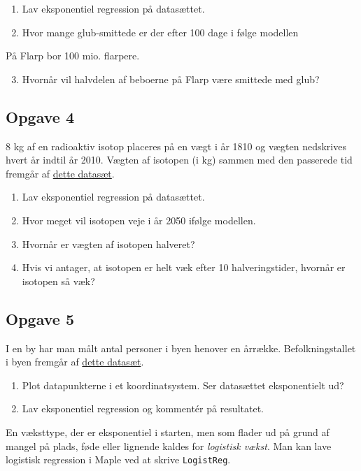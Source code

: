 \begin{enumerate}[label=\roman*)]
	\item Lav eksponentiel regression på datasættet.
	\item Hvor mange glub-smittede er der efter 100 dage i følge modellen
\end{enumerate}
På Flarp bor 100 mio. flarpere. 
\begin{enumerate}[label=\roman*)]
	\setcounter{enumi}{2}
	\item Hvornår vil halvdelen af beboerne på Flarp være smittede med glub?
\end{enumerate}

\subsection*{Opgave 4}
8 kg af en radioaktiv isotop placeres på en vægt i år 1810 og vægten nedskrives hvert år indtil år 2010. Vægten af isotopen (i kg) sammen med den passerede tid fremgår af \href{https://github.com/ChristianJLex/TeachingNotes/raw/master/2022-2023/Data%20og%20lign/Isotopdata.xlsx}{\color{blue!60} dette datasæt}.

\begin{enumerate}[label=\roman*)]
	\item Lav eksponentiel regression på datasættet.
	\item Hvor meget vil isotopen veje i år 2050 ifølge modellen.
	\item Hvornår er vægten af isotopen halveret?
	\item Hvis vi antager, at isotopen er helt væk efter 10 halveringstider, hvornår er isotopen så væk?
\end{enumerate}

\subsection*{Opgave 5}

I en by har man målt antal personer i byen henover en årrække. Befolkningstallet i byen fremgår af \href{https://github.com/ChristianJLex/TeachingNotes/raw/master/2023-2024/Data%20og%20lign/befolkningibylogist.xlsx}{\color{blue!60} dette datasæt}.

\begin{enumerate}[label=\roman*)]
	\item Plot datapunkterne i et koordinatsystem. Ser datasættet eksponentielt ud?
	\item Lav eksponentiel regression og kommentér på resultatet. 
\end{enumerate}
En væksttype, der er eksponentiel i starten, men som flader ud på grund af mangel på plads, føde eller lignende kaldes for \textit{logistisk vækst}. Man kan lave logistisk regression i Maple ved at skrive \texttt{LogistReg}.



